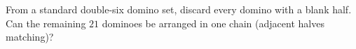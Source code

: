 From a standard double-six domino set, discard every domino with a blank half. Can the remaining $21$ dominoes be arranged in one chain (adjacent halves matching)?
